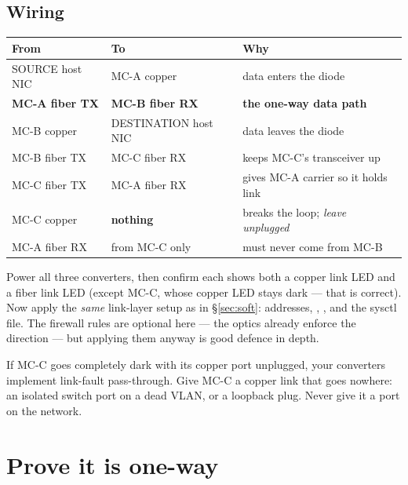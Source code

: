 \documentclass[11pt,a4paper]{article}
\begin{document}
\subsection{Wiring}

\begin{table}[h]
\centering\small
\begin{tabularx}{\textwidth}{@{}llX@{}}
\toprule
\textbf{From} & \textbf{To} & \textbf{Why} \\
\midrule
SOURCE host NIC        & MC-A copper       & data enters the diode \\
\textbf{MC-A fiber TX} & \textbf{MC-B fiber RX} & \textbf{the one-way data path} \\
MC-B copper         & DESTINATION host NIC     & data leaves the diode \\
MC-B fiber TX       & MC-C fiber RX     & keeps MC-C's transceiver up \\
MC-C fiber TX       & MC-A fiber RX     & gives MC-A carrier so it holds link \\
MC-C copper         & \textbf{nothing}  & breaks the loop; \emph{leave unplugged} \\
MC-A fiber RX       & from MC-C only    & must never come from MC-B \\
\bottomrule
\end{tabularx}
\end{table}

Power all three converters, then confirm each shows both a copper link LED and
a fiber link LED (except MC-C, whose copper LED stays dark --- that is
correct). Now apply the \emph{same} link-layer setup as in \S\ref{sec:soft}:
addresses, , , and the sysctl file. The firewall
rules are optional here --- the optics already enforce the direction --- but
applying them anyway is good defence in depth.

\begin{tipbox}
If MC-C goes completely dark with its copper port unplugged, your converters
implement link-fault pass-through. Give MC-C a copper link that goes nowhere:
an isolated switch port on a dead VLAN, or a loopback plug. Never give it a
port on the \srcside{} network.
\end{tipbox}

\section{Prove it is one-way}
\label{sec:prove}
\end{document}
